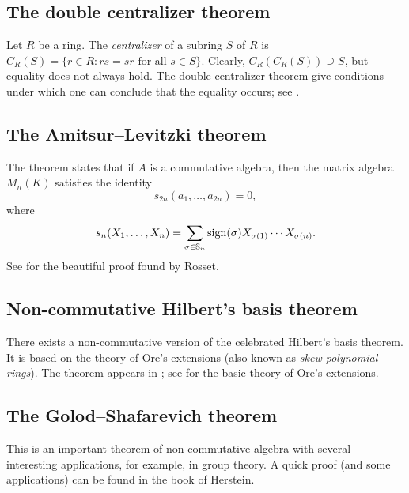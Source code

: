
\subsection*{The double centralizer theorem}

Let $R$ be a ring. 
The \emph{centralizer} of a subring $S$ of $R$ 
is 
$C_R(S)=\{r\in R: rs=sr\text{ for all $s\in S$}\}$. 
Clearly, $C_R(C_R(S))\supseteq S$, but equality does not always hold. 
The double centralizer theorem give conditions under which one can conclude that the equality occurs; see \cite[Chapter 4]{MR3308118}. 

\subsection*{The Amitsur--Levitzki theorem}

The theorem states that 
if $A$ is a commutative algebra, then 
the matrix algebra 
$M_n(K)$ satisfies the identity 
\[
s_{2n}(a_{1},\dots ,a_{2n})=0,
\]
where 
\[
s_{n}(X_1,\dots,X_n)=\sum_{\sigma\in\mathbb{S}_n}\operatorname{sign}(\sigma)X_{\sigma(1)}\cdots X_{\sigma(n)}.
\]
See \cite[Theorem 6.39]{MR3308118} for the beautiful 
proof found by Rosset. 

\subsection*{Non-commutative Hilbert's basis theorem}

There exists a non-commutative version of the celebrated
Hilbert's basis theorem. It is based on the theory of Ore's extensions (also known as \emph{skew polynomial rings}). The theorem
appears in \cite[I.8.3]{MR1321145}; see \cite[I.7]{MR1321145} 
for the basic theory of Ore's extensions. 

\subsection*{The Golod--Shafarevich theorem}

This is an important theorem of non-commutative algebra
with several interesting applications, for example, in group theory. 
A quick proof (and some applications) can be found in the book \cite{MR1449137} of Herstein. 


